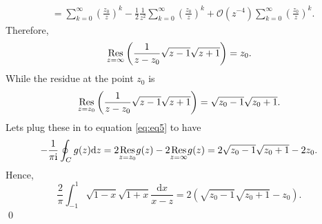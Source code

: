 \documentclass[10pt]{amsart}
\newcommand{\D}{\mathrm{d}}
\newcommand{\I}{\mathrm{i}}
\theoremstyle{nonumberplain}
\begin{document}
\begin{enumerate}[label={\bf {\arabic*}:}]
\begin{enumerate}
\begin{align*}
	&= \sum_{k = 0}^\infty \left(\frac {z_0} z\right)^k - \frac 1 2 \frac 1 {z^2} \sum_{k = 0}^\infty \left(\frac {z_0} z\right)^k + \mathcal O(z^{-4}) \sum_{k = 0}^\infty \left(\frac {z_0} z\right)^k.
\end{align*}
Therefore,
$$
\underset{z=\infty}{{\rm Res}} \left( \frac 1 {z - z_0}\sqrt {z - 1} \sqrt {z + 1} \right) = z_0.
$$
While the residue at the point $z_0$ is 
$$
\underset{z=z_0}{{\rm Res}} \left( \frac 1 {z - z_0} \sqrt {z - 1} \sqrt {z + 1} \right) = \sqrt {z_0 - 1} \sqrt {z_0 + 1}.
$$
Lets plug these in to equation \eqref{eq:eq5} to have
\begin{align*}
- \frac 1 {\pi \I} \oint_C g(z) \D z
	= 2 \underset{z=z_0}{{\rm Res}} g(z) - 2 \underset{z=\infty}{{\rm Res}} g(z)
	=  2 \sqrt {z_0 - 1} \sqrt {z_0 + 1} - 2z_0.
\end{align*}
Hence,
$$
\frac{2}{\pi}\int_{-1}^1 {\sqrt{1-x} \sqrt{1 + x}} \frac{\D x}{x -z} = 2 (\sqrt {z_0 - 1} \sqrt {z_0 + 1} - z_0).
$$
\qed \\

\end{enumerate}

      
    


  
\end{enumerate}
\end{document}
